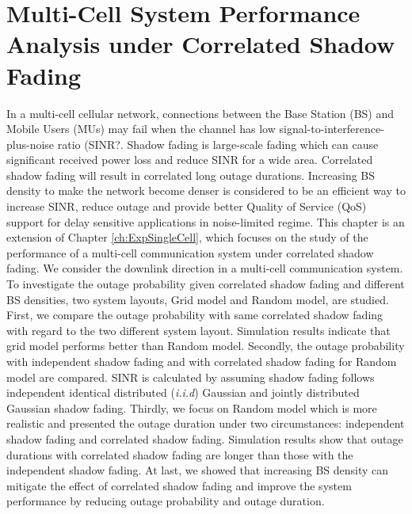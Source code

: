 \chapter{Multi-Cell System Performance Analysis under Correlated Shadow Fading}\label{ch:4}
\par In a multi-cell cellular network, connections between the Base Station (BS) and Mobile Users (MUs) may fail when the channel has low signal-to-interference-plus-noise ratio (SINR?. Shadow fading is large-scale fading which can cause significant received power loss and reduce SINR for a wide area. Correlated shadow fading will result in correlated long outage durations. Increasing BS density to make the network become denser is considered to be an efficient way to increase SINR, reduce outage and provide better Quality of Service (QoS) support for delay sensitive applications in noise-limited regime. This chapter is an extension of Chapter \ref{ch:ExpSingleCell}, which focuses on the study of the performance of a multi-cell communication system under correlated shadow fading. We consider the downlink direction in a multi-cell communication system. To investigate the outage probability given correlated shadow fading and different BS densities, two system layouts, Grid model and Random model, are studied. First, we compare the outage probability with same correlated shadow fading with regard to the two different system layout. Simulation results indicate that grid model performs better than Random model. Secondly, the outage probability with independent shadow fading and with correlated shadow fading for Random model are compared. SINR is calculated by assuming shadow fading follows independent identical distributed (\emph{i.i.d}) Gaussian and jointly distributed Gaussian shadow fading. Thirdly, we focus on Random model which is more realistic and presented the outage duration under two circumstances: independent shadow fading and correlated shadow fading. Simulation results show that outage durations with correlated shadow fading are longer than those with the independent shadow fading. At last, we showed that increasing BS density can mitigate the effect of correlated shadow fading and improve the system performance by reducing outage probability and outage duration. 
